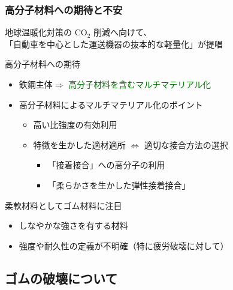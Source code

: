 \documentclass[12pt, dvipdfmx]{beamer}
\begin{document}
\begin{frame}
	\frametitle{高分子材料への期待と不安}
	地球温暖化対策の CO$_2$ 削減へ向けて、\\
	「自動車を中心とした運送機器の抜本的な軽量化」が提唱
	\begin{block}{高分子材料への期待}
		\begin{itemize}
			\item 鉄鋼主体$ \Rightarrow$ \textcolor{green}{高分子材料を含むマルチマテリアル化}
			\item 高分子材料によるマルチマテリアル化のポイント
				\begin{itemize}
					\item \alert{高い比強度}の有効利用
					\item 特徴を生かした適材適所 $\Leftrightarrow$ 適切な接合方法の選択
						\begin{itemize}
							\item {\color{red} 「接着接合」}への高分子の利用
							\item {\color{red} 「柔らかさを生かした弾性接着接合」}
						\end{itemize}
				\end{itemize}
		\end{itemize}
	\end{block}
	\begin{alertblock}{柔軟材料としてゴム材料に注目}
		\begin{itemize}
			\item しなやかな強さを有する材料
			\item {\color{blue}強度や耐久性の定義が不明確（特に疲労破壊に対して）}
		\end{itemize}
	\end{alertblock}
\end{frame}

\subsection{ゴムの破壊について}
\end{document}
